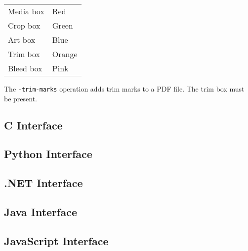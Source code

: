 \documentclass{book}
\begin{document}
\medskip
\begin{tabular}{ll}
Media box & Red \\
Crop box & Green \\
Art box & Blue \\
Trim box & Orange \\
Bleed box & Pink 
\end{tabular}
\medskip

\pagestyle{fancy}The \texttt{-trim-marks} operation adds trim marks to a PDF file. The trim box must be present.

\begin{cpdflib}
\clearpage
\section*{C Interface}
\begin{small}\tt

\end{small}
\end{cpdflib}

\begin{pycpdflib}
\clearpage
\section*{Python Interface}
\begin{small}\tt

\end{small}
\end{pycpdflib}

\begin{dotnetcpdflib}
\clearpage
\section*{.NET Interface}
\begin{small}\tt

\end{small}
\end{dotnetcpdflib}

\begin{jcpdflib}
\clearpage
\section*{Java Interface}
\begin{small}\tt

\end{small}
\end{jcpdflib}

\begin{jscpdflib}
\clearpage
\section*{JavaScript Interface}
\begin{small}\tt

\end{small}
\end{jscpdflib}
\end{document}

